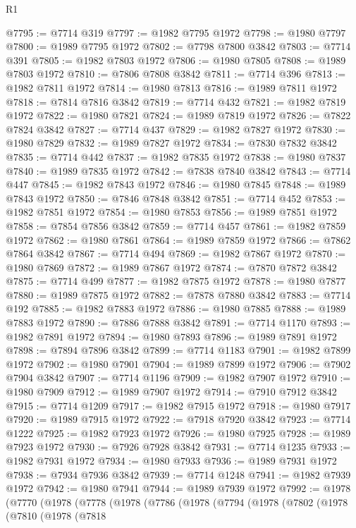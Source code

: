 \begin{lexlean}{R1}
\begin{coremodule}
@7795 := @7714 @319
@7797 := @1982 @7795 @1972
@7798 := @1980 @7797
@7800 := @1989 @7795 @1972
@7802 := @7798 @7800 @3842
@7803 := @7714 @391
@7805 := @1982 @7803 @1972
@7806 := @1980 @7805
@7808 := @1989 @7803 @1972
@7810 := @7806 @7808 @3842
@7811 := @7714 @396
@7813 := @1982 @7811 @1972
@7814 := @1980 @7813
@7816 := @1989 @7811 @1972
@7818 := @7814 @7816 @3842
@7819 := @7714 @432
@7821 := @1982 @7819 @1972
@7822 := @1980 @7821
@7824 := @1989 @7819 @1972
@7826 := @7822 @7824 @3842
@7827 := @7714 @437
@7829 := @1982 @7827 @1972
@7830 := @1980 @7829
@7832 := @1989 @7827 @1972
@7834 := @7830 @7832 @3842
@7835 := @7714 @442
@7837 := @1982 @7835 @1972
@7838 := @1980 @7837
@7840 := @1989 @7835 @1972
@7842 := @7838 @7840 @3842
@7843 := @7714 @447
@7845 := @1982 @7843 @1972
@7846 := @1980 @7845
@7848 := @1989 @7843 @1972
@7850 := @7846 @7848 @3842
@7851 := @7714 @452
@7853 := @1982 @7851 @1972
@7854 := @1980 @7853
@7856 := @1989 @7851 @1972
@7858 := @7854 @7856 @3842
@7859 := @7714 @457
@7861 := @1982 @7859 @1972
@7862 := @1980 @7861
@7864 := @1989 @7859 @1972
@7866 := @7862 @7864 @3842
@7867 := @7714 @494
@7869 := @1982 @7867 @1972
@7870 := @1980 @7869
@7872 := @1989 @7867 @1972
@7874 := @7870 @7872 @3842
@7875 := @7714 @499
@7877 := @1982 @7875 @1972
@7878 := @1980 @7877
@7880 := @1989 @7875 @1972
@7882 := @7878 @7880 @3842
@7883 := @7714 @192
@7885 := @1982 @7883 @1972
@7886 := @1980 @7885
@7888 := @1989 @7883 @1972
@7890 := @7886 @7888 @3842
@7891 := @7714 @1170
@7893 := @1982 @7891 @1972
@7894 := @1980 @7893
@7896 := @1989 @7891 @1972
@7898 := @7894 @7896 @3842
@7899 := @7714 @1183
@7901 := @1982 @7899 @1972
@7902 := @1980 @7901
@7904 := @1989 @7899 @1972
@7906 := @7902 @7904 @3842
@7907 := @7714 @1196
@7909 := @1982 @7907 @1972
@7910 := @1980 @7909
@7912 := @1989 @7907 @1972
@7914 := @7910 @7912 @3842
@7915 := @7714 @1209
@7917 := @1982 @7915 @1972
@7918 := @1980 @7917
@7920 := @1989 @7915 @1972
@7922 := @7918 @7920 @3842
@7923 := @7714 @1222
@7925 := @1982 @7923 @1972
@7926 := @1980 @7925
@7928 := @1989 @7923 @1972
@7930 := @7926 @7928 @3842
@7931 := @7714 @1235
@7933 := @1982 @7931 @1972
@7934 := @1980 @7933
@7936 := @1989 @7931 @1972
@7938 := @7934 @7936 @3842
@7939 := @7714 @1248
@7941 := @1982 @7939 @1972
@7942 := @1980 @7941
@7944 := @1989 @7939 @1972
@7992 := @1978
    (@7770
      (@1978
        (@7778
          (@1978
            (@7786
              (@1978
                (@7794
                  (@1978
                    (@7802
                      (@1978
                        (@7810
                          (@1978
                            (@7818

\end{coremodule}
\end{lexlean}
